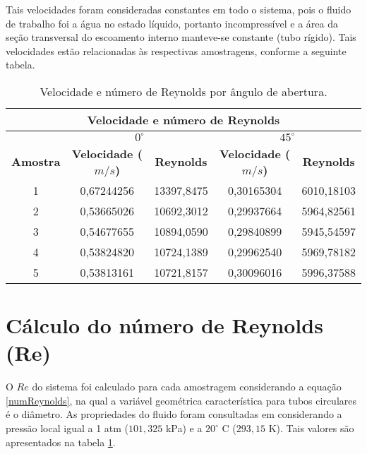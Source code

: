 Tais velocidades foram consideradas constantes em todo o sistema, pois o fluido
de trabalho foi a água no estado líquido, portanto incompressível e a área da
seção transversal do escoamento interno manteve-se constante (tubo rígido). Tais
velocidades estão relacionadas às respectivas amostragens, conforme a seguinte
tabela.

\begin{table}[H]
\centering
\caption{Velocidade e número de Reynolds por ângulo de abertura.}
\label{t:Reynolds}
\begin{tabular}{|c|c|c|c|c|}
\hline
\multicolumn{5}{|c|}{\textbf{Velocidade e  número de Reynolds}}                                                      \\ \hline
\textbf{}        & \multicolumn{2}{c|}{\textbf{$0^\circ$}}         & \multicolumn{2}{c|}{\textbf{$45^\circ$}}        \\ \hline
\textbf{Amostra} & \textbf{Velocidade ($m/s$)} & \textbf{Reynolds} & \textbf{Velocidade ($m/s$)} & \textbf{Reynolds} \\ \hline
1                & 0,67244256                  & 13397,8475        & 0,30165304                  & 6010,18103        \\ \hline
2                & 0,53665026                  & 10692,3012        & 0,29937664                  & 5964,82561        \\ \hline
3                & 0,54677655                  & 10894,0590        & 0,29840899                  & 5945,54597        \\ \hline
4                & 0,53824820                  & 10724,1389        & 0,29962540                  & 5969,78182        \\ \hline
5                & 0,53813161                  & 10721,8157        & 0,30096016                  & 5996,37588        \\ \hline
\end{tabular}
\end{table}

\section{Cálculo do número de Reynolds (Re)}
\label{sec:Reynolds}

O $Re$ do sistema foi calculado para cada amostragem considerando a equação
\eqref{numReynolds}, na qual a variável geométrica característica para tubos
circulares é o diâmetro. As propriedades do fluido foram consultadas em
 considerando a pressão local igual a 1 atm ($101,325$ kPa) e
a $20^\circ$ C ($293,15$ K). Tais valores são apresentados na tabela
\ref{t:Reynolds}.


